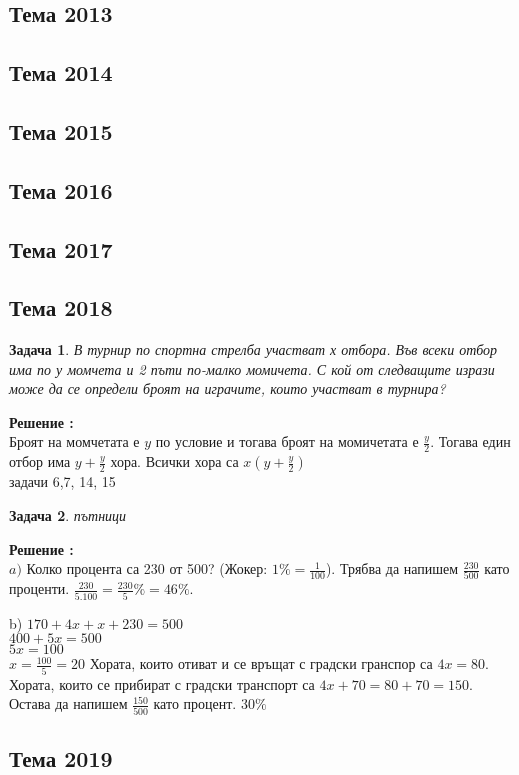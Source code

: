 \documentclass{article}
\newtheorem{problem}{Задача}
\newcounter{solution}
\newcommand\solution{%
	\stepcounter{solution}%
	\textbf{Решение :}\\%
}
\begin{document}
\subsection{Тема 2013}
\subsection{Тема 2014}
\subsection{Тема 2015}
\subsection{Тема 2016}
\subsection{Тема 2017}
\subsection{Тема 2018}
\begin{problem}
	В турнир по спортна стрелба участват х отбора. Във всеки отбор има по у момчета и 2 пъти
	по-малко момичета. С кой от следващите изрази може да се определи броят на играчите, които
	участват в турнира?
\end{problem}
\solution Броят на момчетата е $y$ по условие и тогава броят на момичетата е $\frac{y}{2}$. Тогава един отбор има $y + \frac{y}{2}$ хора. Всички хора са $x(y+\frac{y}{2}) $ \\

задачи 6,7, 14, 15

\begin{problem}
	пътници
\end{problem}

\solution
$a )$ Колко процента са 230 от 500? (Жокер: $1\% = \frac{1}{100} $). Трябва да напишем  $\frac{230}{500}$ като проценти. $\frac{230}{5.100} = \frac{230}{5}\% = 46\%$.

b) $170 + 4x + x+ 230 = 500 $ \\
$ 400 + 5x = 500 $ \\ $5x = 100 $ \\
$x = \frac{100}{5} = 20  $
Хората, които отиват и се връщат с градски гранспор са $4x = 80 $. Хората, които се прибират с градски транспорт са $4x +70 = 80 + 70 = 150.$ Остава да напишем $\frac{150}{500} $ като процент. 
$30\% $


\subsection{Тема 2019}
\end{document}
